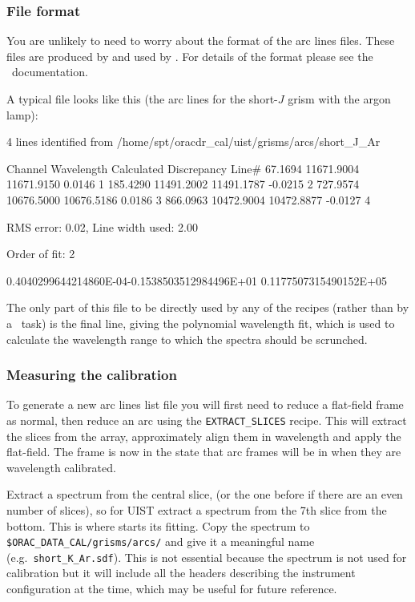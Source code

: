 \documentclass[twoside,11pt,nolof]{starlink}
\providecommand{\FIGARO}{\xref{{\sc{Figaro}}}{sun86}{}}
\begin{document}
\subsubsection{File format}

You are unlikely to need to worry about the format of the arc lines
files. These files are produced by  and
used by . For details of the format
please see the \FIGARO\ documentation.

A typical file looks like this (the arc lines for the short-$J$ grism
with the argon lamp):

\begin{terminalv}
      4 lines identified from /home/spt/oracdr_cal/uist/grisms/arcs/short_J_Ar

        Channel   Wavelength   Calculated  Discrepancy  Line#
        67.1694   11671.9004   11671.9150       0.0146      1
       185.4290   11491.2002   11491.1787      -0.0215      2
       727.9574   10676.5000   10676.5186       0.0186      3
       866.0963   10472.9004   10472.8877      -0.0127      4

      RMS error:       0.02, Line width used:  2.00

      Order of fit:   2

      0.4040299644214860E-04-0.1538503512984496E+01 0.1177507315490152E+05
\end{terminalv}

The only part of this file to be directly used by any of the recipes
(rather than by a \FIGARO\ task) is the final line, giving the
polynomial wavelength fit, which is used to calculate the wavelength
range to which the spectra should be scrunched.

\subsubsection{Measuring the calibration}

To generate a new arc lines list file you will first need to reduce a
flat-field frame as normal, then reduce an arc using the \texttt{EXTRACT\_SLICES} recipe. This will extract the slices from the
array, approximately align them in wavelength and apply the
flat-field. The frame is now in the state that arc frames will be in
when they are wavelength calibrated.

Extract a spectrum from the central slice, (or the one before if there
are an even number of slices), so for UIST extract a spectrum from the
7th slice from the bottom. This is where  starts its fitting. Copy the spectrum to \texttt{\$ORAC\_DATA\_CAL/grisms/arcs/} and give it a meaningful name (e.g.\
\texttt{short\_K\_Ar.sdf}). This is not essential because the spectrum is
not used for calibration but it will include all the headers
describing the instrument configuration at the time, which may be
useful for future reference.
\end{document}
